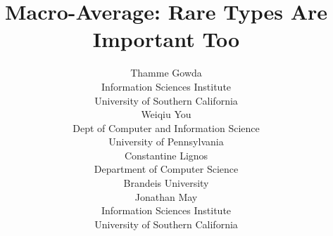 



\title{Macro-Average: Rare Types Are Important Too}
%
\setlength\titlebox{5.75cm}
%






 \author{
    Thamme Gowda \\ 
    Information Sciences Institute \\
    University of Southern California\\
 \And 
    Weiqiu You \\
    Dept of Computer and Information Science \\
    University of Pennsylvania \\
 \AND
    Constantine Lignos \\
    Department  of Computer Science \\
    Brandeis University \\
  \And 
    Jonathan May \\
    Information Sciences Institute \\
    University of Southern California \\
        }

